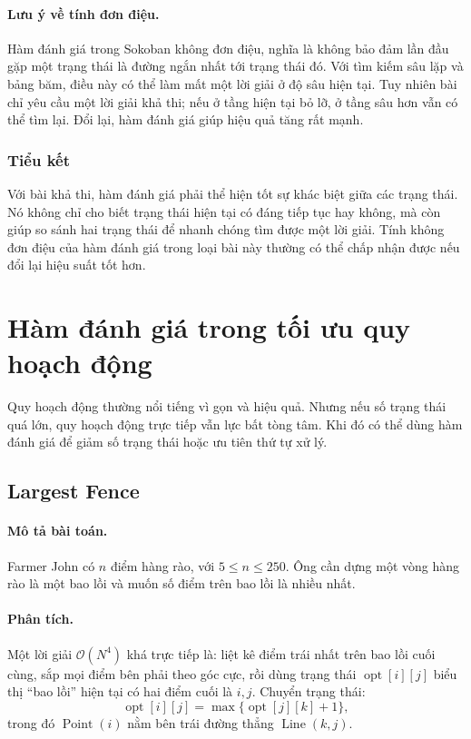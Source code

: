 \documentclass[11pt]{article}
\newcommand{\Oh}{\mathcal{O}}
\newcommand{\opt}{\operatorname{opt}}
\begin{document}
\paragraph{Lưu ý về tính đơn điệu.}
Hàm đánh giá trong Sokoban không đơn điệu, nghĩa là không bảo đảm lần đầu gặp
một trạng thái là đường ngắn nhất tới trạng thái đó. Với tìm kiếm sâu lặp và
bảng băm, điều này có thể làm mất một lời giải ở độ sâu hiện tại. Tuy nhiên
bài chỉ yêu cầu một lời giải khả thi; nếu ở tầng hiện tại bỏ lỡ, ở tầng sâu
hơn vẫn có thể tìm lại. Đổi lại, hàm đánh giá giúp hiệu quả tăng rất mạnh.

\subsubsection{Tiểu kết}

Với bài khả thi, hàm đánh giá phải thể hiện tốt sự khác biệt giữa các trạng
thái. Nó không chỉ cho biết trạng thái hiện tại có đáng tiếp tục hay không, mà
còn giúp so sánh hai trạng thái để nhanh chóng tìm được một lời giải. Tính
không đơn điệu của hàm đánh giá trong loại bài này thường có thể chấp nhận
được nếu đổi lại hiệu suất tốt hơn.

\section{Hàm đánh giá trong tối ưu quy hoạch động}

Quy hoạch động thường nổi tiếng vì gọn và hiệu quả. Nhưng nếu số trạng thái quá
lớn, quy hoạch động trực tiếp vẫn lực bất tòng tâm. Khi đó có thể dùng hàm
đánh giá để giảm số trạng thái hoặc ưu tiên thứ tự xử lý.

\subsection{Largest Fence}

\paragraph{Mô tả bài toán.}
Farmer John có \(n\) điểm hàng rào, với \(5\le n\le250\). Ông cần dựng một
vòng hàng rào là một bao lồi và muốn số điểm trên bao lồi là nhiều nhất.

\paragraph{Phân tích.}
Một lời giải \(\Oh(N^4)\) khá trực tiếp là: liệt kê điểm trái nhất trên bao
lồi cuối cùng, sắp mọi điểm bên phải theo góc cực, rồi dùng trạng thái
\(\opt[i][j]\) biểu thị ``bao lồi'' hiện tại có hai điểm cuối là \(i,j\). Chuyển
trạng thái:
\[
  \opt[i][j]=\max\{\opt[j][k]+1\},
\]
trong đó \(\operatorname{Point}(i)\) nằm bên trái đường thẳng
\(\operatorname{Line}(k,j)\).
\end{document}
